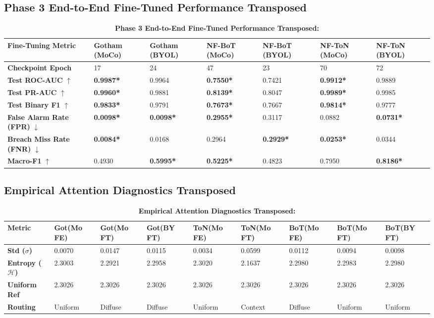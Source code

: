 \documentclass[10pt,a4paper]{article}
\newcommand{\best}[1]{\textbf{\textcolor{bestgreen}{#1*}}}
\begin{document}
\subsection{Phase 3 End-to-End Fine-Tuned Performance Transposed}
\begin{table}[htbp]
\centering
\small
\caption{\textbf{Phase 3 End-to-End Fine-Tuned Performance Transposed:}}
\begin{tabularx}{\textwidth}{lXXXXXX}
\toprule
\textbf{Fine-Tuning Metric} & \textbf{Gotham (MoCo)} & \textbf{Gotham (BYOL)} & \textbf{NF-BoT (MoCo)} & \textbf{NF-BoT (BYOL)} & \textbf{NF-ToN (MoCo)} & \textbf{NF-ToN (BYOL)} \\
\midrule
\textbf{Checkpoint Epoch} & 17 & 24 & 47 & 23 & 70 & 72 \\
\textbf{Test ROC-AUC} $\uparrow$ & \best{0.9987} & 0.9964 & \best{0.7550} & 0.7421 & \best{0.9912} & 0.9889 \\
\textbf{Test PR-AUC} $\uparrow$ & \best{0.9960} & 0.9881 & \best{0.8139} & 0.8047 & \best{0.9989} & 0.9985 \\
\textbf{Test Binary F1} $\uparrow$ & \best{0.9833} & 0.9791 & \best{0.7673} & 0.7667 & \best{0.9814} & 0.9777 \\
\textbf{False Alarm Rate (FPR)} $\downarrow$ & \best{0.0098} & \best{0.0098} & \best{0.2955} & 0.3117 & 0.0882 & \best{0.0731} \\
\textbf{Breach Miss Rate (FNR)} $\downarrow$ & \best{0.0084} & 0.0168 & 0.2964 & \best{0.2929} & \best{0.0253} & 0.0344 \\
\textbf{Macro-F1} $\uparrow$ & 0.4930 & \best{0.5995} & \best{0.5225} & 0.4823 & 0.7950 & \best{0.8186} \\
\bottomrule
\end{tabularx}
\label{tab:ft_transposed}
\end{table}

\subsection{Empirical Attention Diagnostics Transposed}
\begin{table}[htbp]
\centering
\small
\caption{\textbf{Empirical Attention Diagnostics Transposed:}}
\begin{tabularx}{\textwidth}{lXXXXXXXX}
\toprule
\textbf{Metric} & \textbf{Got(Mo FE)} & \textbf{Got(Mo FT)} & \textbf{Got(BY FT)} & \textbf{ToN(Mo FE)} & \textbf{ToN(Mo FT)} & \textbf{BoT(Mo FE)} & \textbf{BoT(Mo FT)} & \textbf{BoT(BY FT)} \\
\midrule
\textbf{Std ($\sigma$)} & 0.0070 & 0.0147 & 0.0115 & 0.0034 & 0.0599 & 0.0112 & 0.0094 & 0.0098 \\
\textbf{Entropy ($\mathcal{H}$)} & 2.3003 & 2.2921 & 2.2958 & 2.3020 & 2.1637 & 2.2980 & 2.2983 & 2.2980 \\
\textbf{Uniform Ref} & 2.3026 & 2.3026 & 2.3026 & 2.3026 & 2.3026 & 2.3026 & 2.3026 & 2.3026 \\
\textbf{Routing} & Uniform & Diffuse & Diffuse & Uniform & Context & Diffuse & Uniform & Uniform \\
\bottomrule
\end{tabularx}
\label{tab:att_transposed}
\end{table}
\end{document}
